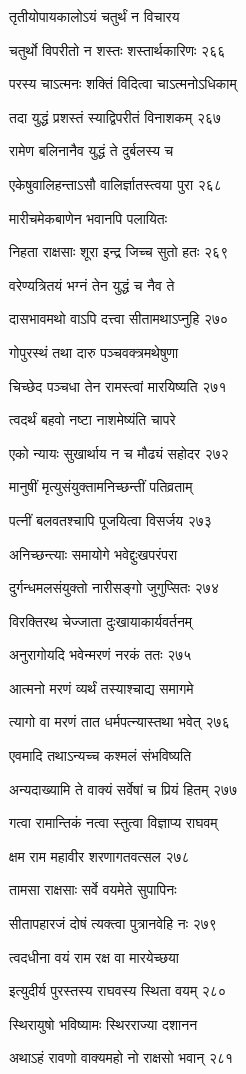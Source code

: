 तृतीयोपायकालोऽयं चतुर्थं न विचारय

चतुर्थो विपरीतो न शस्तः शस्तार्थकारिणः २६६

परस्य चाऽत्मनः शक्तिं विदित्वा चाऽत्मनोऽधिकाम्

तदा युद्धं प्रशस्तं स्याद्विपरीतं विनाशकम् २६७

रामेण बलिनानैव युद्धं ते दुर्बलस्य च

एकेषुवालिहन्ताऽसौ वालिर्ज्ञातस्त्वया पुरा २६८

मारीचमेकबाणेन भवानपि पलायितः

निहता राक्षसाः शूरा इन्द्र जिच्च सुतो हतः २६९

वरेण्यत्रितयं भग्नं तेन युद्धं च नैव ते

दासभावमथो वाऽपि दत्त्वा सीतामथाऽप्नुहि २७०

गोपुरस्थं तथा दारु पञ्चवक्त्रमथेषुणा

चिच्छेद पञ्चधा तेन रामस्त्वां मारयिष्यति २७१

त्वदर्थं बहवो नष्टा नाशमेष्यंति चापरे

एको न्यायः सुखार्थाय न च मौढ्यं सहोदर २७२

मानुषीं मृत्युसंयुक्तामनिच्छन्तीं पतिव्रताम्

पत्नीं बलवतश्चापि पूजयित्वा विसर्जय २७३

अनिच्छन्त्याः समायोगे भवेद्दुःखपरंपरा

दुर्गन्धमलसंयुक्तो नारीसङ्गो जुगुप्सितः २७४

विरक्तिरथ चेज्जाता दुःखायाकार्यवर्तनम्

अनुरागोयदि भवेन्मरणं नरकं ततः २७५

आत्मनो मरणं व्यर्थं तस्याश्चाद्य समागमे

त्यागो वा मरणं तात धर्मपत्न्यास्तथा भवेत् २७६

एवमादि तथाऽन्यच्च कश्मलं संभविष्यति

अन्यदाख्यामि ते वाक्यं सर्वेषां च प्रियं हितम् २७७

गत्वा रामान्तिकं नत्वा स्तुत्वा विज्ञाप्य राघवम्

क्षम राम महावीर शरणागतवत्सल २७८

तामसा राक्षसाः सर्वे वयमेते सुपापिनः

सीतापहारजं दोषं त्यक्त्वा पुत्रानवेहि नः २७९

त्वदधीना वयं राम रक्ष वा मारयेच्छया

इत्युदीर्य पुरस्तस्य राघवस्य स्थिता वयम् २८०

स्थिरायुषो भविष्यामः स्थिरराज्या दशानन

अथाऽहं रावणो वाक्यमहो नो राक्षसो भवान् २८१


